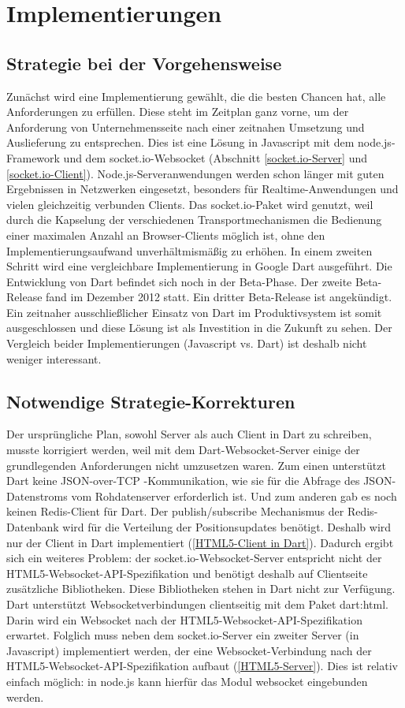 
\chapter{Implementierungen}\label{s.Implementierungen}

\section{Strategie bei der Vorgehensweise}\label{Strategie bei der Vorgehensweise}
Zunächst wird eine Implementierung gewählt, die die besten Chancen hat, alle Anforderungen zu erfüllen. Diese steht im Zeitplan ganz vorne, um der Anforderung von Unternehmensseite nach einer zeitnahen Umsetzung und Auslieferung zu entsprechen.
Dies ist eine Lösung in Javascript mit dem node.js-Framework und dem socket.io-Websocket (Abschnitt \ref{socket.io-Server} und \ref{socket.io-Client}). Node.js-Serveranwendungen werden schon länger mit guten Ergebnissen in Netzwerken eingesetzt, besonders für Realtime-Anwendungen und vielen gleichzeitig verbunden Clients. Das socket.io-Paket wird genutzt, weil durch die Kapselung der verschiedenen Transportmechanismen die Bedienung einer maximalen Anzahl an Browser-Clients möglich ist, ohne den Implementierungsaufwand unverhältmismäßig zu erhöhen.
In einem zweiten Schritt wird eine vergleichbare Implementierung in Google Dart ausgeführt. Die Entwicklung von Dart befindet sich noch in der Beta-Phase. Der zweite Beta-Release fand im Dezember 2012 statt. Ein dritter Beta-Release ist angekündigt. Ein zeitnaher ausschließlicher Einsatz von Dart im Produktivsystem ist somit ausgeschlossen und diese Lösung ist als Investition in die Zukunft zu sehen. 
Der Vergleich beider Implementierungen (Javascript vs. Dart) ist deshalb nicht weniger interessant.   
\section{Notwendige Strategie-Korrekturen}
Der ursprüngliche Plan, sowohl Server als auch Client in Dart zu schreiben, musste korrigiert werden, weil mit dem Dart-Websocket-Server einige der grundlegenden Anforderungen nicht umzusetzen waren. Zum einen unterstützt Dart keine JSON-over-TCP -Kommunikation, wie sie für die Abfrage des JSON-Datenstroms vom Rohdatenserver erforderlich ist. Und zum anderen gab es noch keinen Redis-Client für Dart. Der publish/subscribe Mechanismus der Redis-Datenbank wird für die Verteilung der Positionsupdates benötigt.
Deshalb wird nur der Client in Dart implementiert (\ref{HTML5-Client in Dart}). Dadurch ergibt sich ein weiteres Problem: der socket.io-Websocket-Server entspricht nicht der HTML5-Websocket-API-Spezifikation und benötigt deshalb auf Clientseite zusätzliche Bibliotheken. Diese Bibliotheken stehen in Dart nicht zur Verfügung. Dart unterstützt Websocketverbindungen clientseitig mit dem Paket dart:html. Darin wird ein Websocket nach der HTML5-Websocket-API-Spezifikation erwartet.
Folglich muss neben dem socket.io-Server ein zweiter Server (in Javascript) implementiert werden, der eine Websocket-Verbindung nach der HTML5-Websocket-API-Spezifikation aufbaut (\ref{HTML5-Server}). Dies ist relativ einfach  möglich: in node.js kann hierfür das Modul websocket eingebunden werden.
